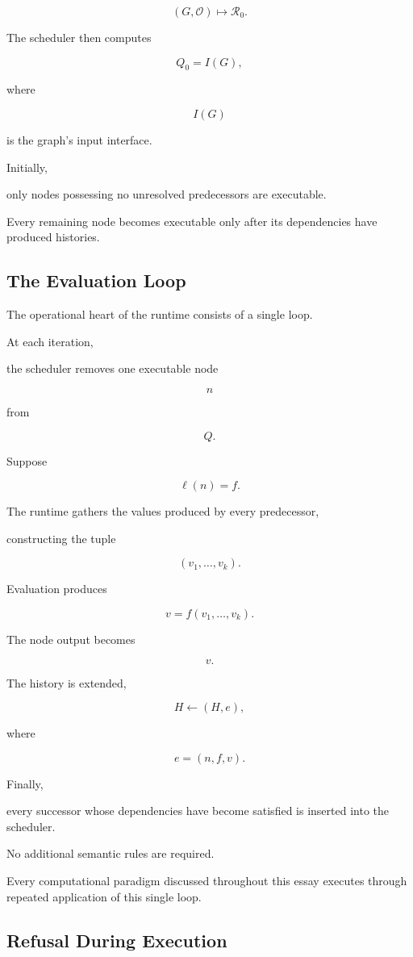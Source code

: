 \documentclass[12pt,oneside]{article}
\begin{document}
\[
(G,\mathcal O)
\longmapsto
\mathcal R_0.
\]

The scheduler then computes

\[
Q_0
=
I(G),
\]

where

\[
I(G)
\]

is the graph's input interface.

Initially,

only nodes possessing no unresolved predecessors are executable.

Every remaining node becomes executable only after its dependencies have produced histories.

\subsection{The Evaluation Loop}

The operational heart of the runtime consists of a single loop.

At each iteration,

the scheduler removes one executable node

\[
n
\]

from

\[
Q.
\]

Suppose

\[
\ell(n)=f.
\]

The runtime gathers the values produced by every predecessor,

constructing the tuple

\[
(v_1,\ldots,v_k).
\]

Evaluation produces

\[
v=f(v_1,\ldots,v_k).
\]

The node output becomes

\[
v.
\]

The history is extended,

\[
H
\leftarrow
(H,e),
\]

where

\[
e
=
(n,f,v).
\]

Finally,

every successor whose dependencies have become satisfied is inserted into the scheduler.

No additional semantic rules are required.

Every computational paradigm discussed throughout this essay executes through repeated application of this single loop.

\subsection{Refusal During Execution}
\end{document}
